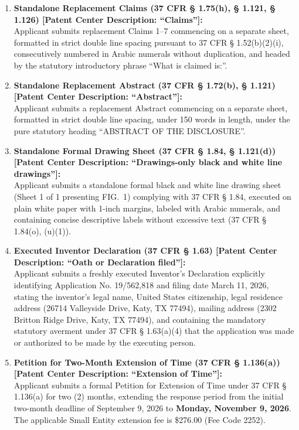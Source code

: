 \documentclass[11pt,letterpaper]{article}
\begin{document}
\begin{enumerate}[leftmargin=*]
    \item \textbf{Standalone Replacement Claims (37 CFR \S{} 1.75(h), \S{} 1.121, \S{} 1.126) [Patent Center Description: ``Claims'']:} \\
    Applicant submits replacement Claims 1--7 commencing on a separate sheet, formatted in strict double line spacing pursuant to 37 CFR \S{} 1.52(b)(2)(i), consecutively numbered in Arabic numerals without duplication, and headed by the statutory introductory phrase ``What is claimed is:''.

    \item \textbf{Standalone Replacement Abstract (37 CFR \S{} 1.72(b), \S{} 1.121) [Patent Center Description: ``Abstract'']:} \\
    Applicant submits a replacement Abstract commencing on a separate sheet, formatted in strict double line spacing, under 150 words in length, under the pure statutory heading ``ABSTRACT OF THE DISCLOSURE''.

    \item \textbf{Standalone Formal Drawing Sheet (37 CFR \S{} 1.84, \S{} 1.121(d)) [Patent Center Description: ``Drawings-only black and white line drawings'']:} \\
    Applicant submits a standalone formal black and white line drawing sheet (Sheet 1 of 1 presenting FIG.~1) complying with 37 CFR \S{} 1.84, executed on plain white paper with 1-inch margins, labeled with Arabic numerals, and containing concise descriptive labels without excessive text (37 CFR \S{} 1.84(o), (u)(1)).

    \item \textbf{Executed Inventor Declaration (37 CFR \S{} 1.63) [Patent Center Description: ``Oath or Declaration filed'']:} \\
    Applicant submits a freshly executed Inventor's Declaration explicitly identifying Application No. 19/562,818 and filing date March 11, 2026, stating the inventor's legal name, United States citizenship, legal residence address (26714 Valleyside Drive, Katy, TX 77494), mailing address (2302 Britton Ridge Drive, Katy, TX 77494), and containing the mandatory statutory averment under 37 CFR \S{} 1.63(a)(4) that the application was made or authorized to be made by the executing person.

    \item \textbf{Petition for Two-Month Extension of Time (37 CFR \S{} 1.136(a)) [Patent Center Description: ``Extension of Time'']:} \\
    Applicant submits a formal Petition for Extension of Time under 37 CFR \S{} 1.136(a) for two (2) months, extending the response period from the initial two-month deadline of September 9, 2026 to \textbf{Monday, November 9, 2026}. The applicable Small Entity extension fee is \$276.00 (Fee Code 2252).


\end{enumerate}
\end{document}
